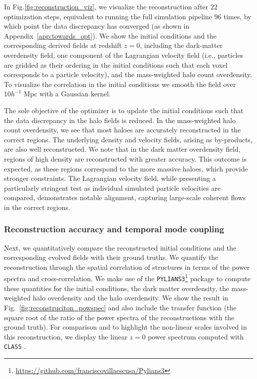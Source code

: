 In Fig.\ref{fig:reconstruction_viz}, we visualize the reconstruction after $22$ optimization steps, equivalent to running the full simulation pipeline $96$ times, by which point the data discrepancy has converged (as shown in Appendix~\ref{app:towards_opt}). We show the initial conditions and the corresponding derived fields at redshift $z=0$, including the dark-matter overdensity field, one component of the Lagrangian velocity field (i.e., particles are gridded as their ordering in the initial conditions such that each voxel corresponds to a particle velocity), and the mass-weighted halo count overdensity. To visualize the correlation in the initial conditions we smooth the field over $10h^{-1}$ Mpc with a Gaussian kernel. 

The sole objective of the optimizer is to update the initial conditions such that the data discrepancy in the halo fields is reduced. In the mass-weighted halo count overdensity, we see that most haloes are accurately reconstructed in the correct regions. The underlying density and velocity fields, arising as by-products, are also well reconstructed. We note that in the dark matter overdensity field, regions of high density are reconstructed with greater accuracy. This outcome is expected, as these regions correspond to the more massive haloes, which provide stronger constraints. The Lagrangian velocity field, while presenting a particularly stringent test as individual simulated particle velocities are compared, demonstrates notable alignment, capturing large-scale coherent flows in the correct regions. 

\subsubsection{Reconstruction accuracy and temporal mode coupling}
\label{sec:reconstruction_powspec_etc}

Next, we quantitatively compare the reconstructed initial conditions and the corresponding evolved fields with their ground truths. We quantify the reconstruction through the spatial correlation of structures in terms of the power spectra and cross-correlation. We make use of the \texttt{PYLIANS3}\footnote{\href{https://github.com/franciscovillaescusa/Pylians3}{https://github.com/franciscovillaescusa/Pylians3}} package \citep{Pylians} to compute these quantities for the initial conditions, the dark matter overdensity, the mass-weighted halo overdensity and the halo overdensity. We show the result in Fig.~\ref{fig:reconstruciton_powspec} and also include the transfer function (the square root of the ratio of the power spectra of the reconstructions with the ground truth). For comparison and to highlight the non-linear scales involved in this reconstruction, we display the linear $z=0$ power spectrum computed with \texttt{CLASS} \citep{Blas2011}.

